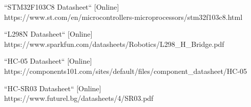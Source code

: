 \begin{thebibliography}{00}

     ``STM32F103C8 Datasheet`` [Online]\\
     https://www.st.com/en/microcontrollers-microprocessors/stm32f103c8.html

     ``L298N Datasheet`` [Online]\\
    https://www.sparkfun.com/datasheets/Robotics/L298\_H\_Bridge.pdf

     ``HC-05 Datasheet`` [Online]\\
    https://components101.com/sites/default/files/component\_datasheet/HC-05%

     ``HC-SR03 Datasheet`` [Online]\\
    https://www.futurel.bg/datasheets/4/SR03.pdf


\end{thebibliography}
  